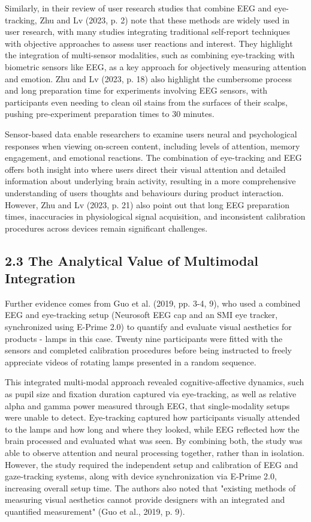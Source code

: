 \documentclass[
]{article}
\begin{document}
Similarly, in their review of user research studies that combine EEG and eye-tracking, Zhu and Lv (2023, p. 2) note that these methods are widely used in user research, with many studies integrating traditional self-report techniques with objective approaches to assess user reactions and interest. They highlight the integration of multi-sensor modalities, such as combining eye-tracking with biometric sensors like EEG, as a key approach for objectively measuring attention and emotion. Zhu and Lv (2023, p. 18) also highlight the cumbersome process and long preparation time for experiments involving EEG sensors, with participants even needing to clean oil stains from the surfaces of their scalps, pushing pre-experiment preparation times to 30 minutes.

Sensor-based data enable researchers to examine users\textquotesingle{} neural and psychological responses when viewing on-screen content, including levels of attention, memory engagement, and emotional reactions. The combination of eye-tracking and EEG offers both insight into where users direct their visual attention and detailed information about underlying brain activity, resulting in a more comprehensive understanding of users\textquotesingle{} thoughts and behaviours during product interaction. However, Zhu and Lv (2023, p. 21) also point out that long EEG preparation times, inaccuracies in physiological signal acquisition, and inconsistent calibration procedures across devices remain significant challenges.

\hypertarget{the-analytical-value-of-multimodal-integration}{%
\subsection{2.3 The Analytical Value of Multimodal Integration}\label{the-analytical-value-of-multimodal-integration}}

Further evidence comes from Guo et al. (2019, pp. 3-4, 9), who used a combined EEG and eye-tracking setup (Neurosoft EEG cap and an SMI eye tracker, synchronized using E-Prime 2.0) to quantify and evaluate visual aesthetics for products - lamps in this case. Twenty nine participants were fitted with the sensors and completed calibration procedures before being instructed to freely appreciate videos of rotating lamps presented in a random sequence.

This integrated multi-modal approach revealed cognitive-affective dynamics, such as pupil size and fixation duration captured via eye-tracking, as well as relative alpha and gamma power measured through EEG, that single-modality setups were unable to detect. Eye-tracking captured how participants visually attended to the lamps and how long and where they looked, while EEG reflected how the brain processed and evaluated what was seen. By combining both, the study was able to observe attention and neural processing together, rather than in isolation. However, the study required the independent setup and calibration of EEG and gaze-tracking systems, along with device synchronization via E-Prime 2.0, increasing overall setup time. The authors also noted that "existing methods of measuring visual aesthetics cannot provide designers with an integrated and quantified measurement" (Guo et al., 2019, p. 9).
\end{document}
